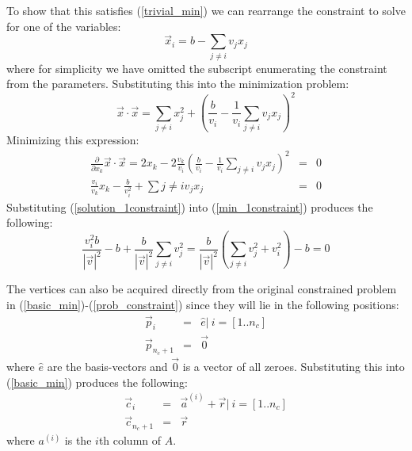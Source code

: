 \documentclass{article}
\begin{document}
To show that this satisfies (\ref{trivial_min}) we can rearrange the constraint
to solve for one of the variables:
\begin{equation}
	\vec x_i = b - \sum_{j \ne i} v_j x_j
\end{equation}
where for simplicity we have omitted the subscript enumerating the constraint
from the parameters.
Substituting this into the minimization problem:
\begin{equation}
	\vec x \cdot \vec x = \sum_{j \ne i} x_j^2 + 
	\left (\frac{b}{v_i} - \frac{1}{v_i} \sum_{j \ne i} v_j x_j \right )^2
\end{equation}
Minimizing this expression:
\begin{eqnarray}
	\frac{\partial}{\partial x_k} \vec x \cdot \vec x = 2 x_k - 2 \frac{v_k}{v_i} \left (\frac{b}{v_i} - \frac{1}{v_i} \sum_{j \ne i} v_j x_j \right )^2 
	& = & 0 \\
	\frac{v_i}{v_k} x_k - \frac{b}{v_i^2} + \sum{j \ne i} v_j x_j & = & 0
	\label{min_1constraint}
\end{eqnarray}
Substituting (\ref{solution_1constraint}) into (\ref{min_1constraint})
produces the following:
\begin{equation}
	\frac{v_i^2 b}{|\vec v|^2} - b + \frac{b}{|\vec v|^2} \sum_{j \ne i} v_j^2 
    = \frac{b}{|\vec v|^2} \left (\sum_{j \ne i} v_j^2 + v_i^2 \right ) - b = 0
\end{equation}

The vertices can also be acquired directly from the original constrained
problem in (\ref{basic_min})-(\ref{prob_constraint})
since they will lie in the following positions:
\begin{eqnarray}
	\vec p_i & = & \hat e | ~ i=[1..n_c] \\
	\vec p_{n_c+1} & = & \vec 0
\end{eqnarray}
where $\hat e$ are the basis-vectors and $\vec 0$ is a vector of all zeroes.
Substituting this into (\ref{basic_min}) produces the following:
\begin{eqnarray}
	\vec c_i & = & \vec a^{(i)} + \vec r | ~ i=[1..n_c] \label{vertex_i}\\
	\vec c_{n_c+1} & = & \vec r \label{vertex_nplus1}
\end{eqnarray}
where $a^{(i)}$ is the $i$th column of $A$.
\end{document}
